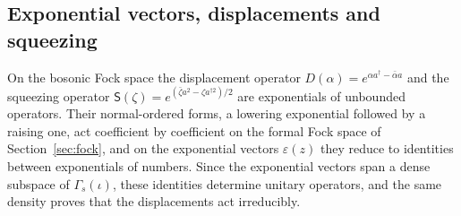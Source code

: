 \providecommand{\cU}{\mathcal U}
\providecommand{\cV}{\mathcal V}
\providecommand{\sU}{\mathsf U}
\providecommand{\sS}{\mathsf S}
\providecommand{\dom}{\operatorname{dom}}
\providecommand{\Dord}{D^{\mathrm{ord}}}
\providecommand{\Sord}{\mathsf S^{\mathrm{ord}}}
\providecommand{\Cb}{\mathcal S}
\providecommand{\Gs}{\Gamma_s(\iota)}
\begin{veteenv}
\setlength{\emergencystretch}{3em}
\section{Exponential vectors, displacements and squeezing}\label{sec:displacement}

On the bosonic Fock space the displacement operator $D(\alpha)=e^{\alpha a^\dagger-\bar\alpha a}$ and the squeezing
operator $\sS(\zeta)=e^{(\bar\zeta a^2-\zeta a^{\dagger2})/2}$ are exponentials of unbounded operators. Their normal-ordered
forms, a lowering exponential followed by a raising one, act coefficient by coefficient on the formal Fock space of
Section~\ref{sec:fock}, and on the exponential vectors $\varepsilon(z)$ they reduce to identities between exponentials of
numbers. Since the exponential vectors span a dense subspace of $\Gamma_s(\iota)$, these identities determine unitary
operators, and the same density proves that the displacements act irreducibly.


\end{veteenv}
